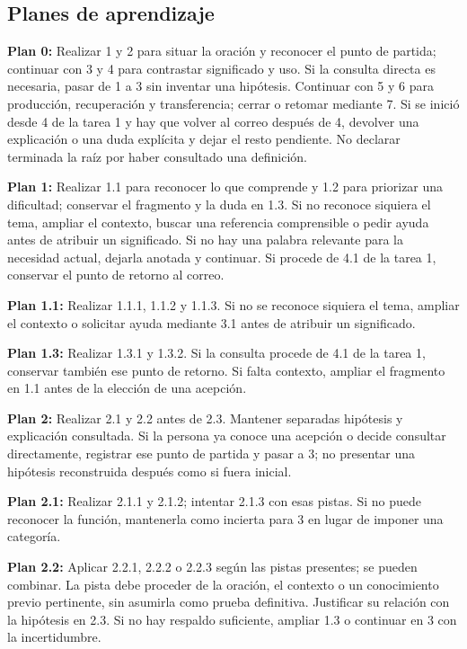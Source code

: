 \documentclass[10pt,a4paper]{article}
\begin{document}
\subsection*{Planes de aprendizaje}
\textbf{Plan 0:} Realizar 1 y 2 para situar la oración y reconocer el punto de partida; continuar con 3 y 4 para contrastar significado y uso. Si la consulta directa es necesaria, pasar de 1 a 3 sin inventar una hipótesis. Continuar con 5 y 6 para producción, recuperación y transferencia; cerrar o retomar mediante 7. Si se inició desde 4 de la tarea 1 y hay que volver al correo después de 4, devolver una explicación o una duda explícita y dejar el resto pendiente. No declarar terminada la raíz por haber consultado una definición.\par
\textbf{Plan 1:} Realizar 1.1 para reconocer lo que comprende y 1.2 para priorizar una dificultad; conservar el fragmento y la duda en 1.3. Si no reconoce siquiera el tema, ampliar el contexto, buscar una referencia comprensible o pedir ayuda antes de atribuir un significado. Si no hay una palabra relevante para la necesidad actual, dejarla anotada y continuar. Si procede de 4.1 de la tarea 1, conservar el punto de retorno al correo.\par
\textbf{Plan 1.1:} Realizar 1.1.1, 1.1.2 y 1.1.3. Si no se reconoce siquiera el tema, ampliar el contexto o solicitar ayuda mediante 3.1 antes de atribuir un significado.\par
\textbf{Plan 1.3:} Realizar 1.3.1 y 1.3.2. Si la consulta procede de 4.1 de la tarea 1, conservar también ese punto de retorno. Si falta contexto, ampliar el fragmento en 1.1 antes de la elección de una acepción.\par
\textbf{Plan 2:} Realizar 2.1 y 2.2 antes de 2.3. Mantener separadas hipótesis y explicación consultada. Si la persona ya conoce una acepción o decide consultar directamente, registrar ese punto de partida y pasar a 3; no presentar una hipótesis reconstruida después como si fuera inicial.\par
\textbf{Plan 2.1:} Realizar 2.1.1 y 2.1.2; intentar 2.1.3 con esas pistas. Si no puede reconocer la función, mantenerla como incierta para 3 en lugar de imponer una categoría.\par
\textbf{Plan 2.2:} Aplicar 2.2.1, 2.2.2 o 2.2.3 según las pistas presentes; se pueden combinar. La pista debe proceder de la oración, el contexto o un conocimiento previo pertinente, sin asumirla como prueba definitiva. Justificar su relación con la hipótesis en 2.3. Si no hay respaldo suficiente, ampliar 1.3 o continuar en 3 con la incertidumbre.\par
\end{document}
